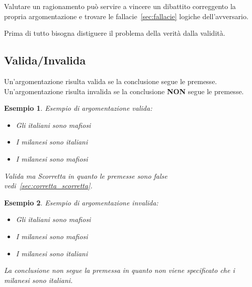 \documentclass[../main.tex, class=article, 12pt]{subfiles}
\newtheorem{exmp}{Esempio}[section]
\theoremstyle{definition}
\begin{document}
Valutare un ragionamento può servire a vincere un dibattito correggento la propria argomentazione e trovare le fallacie~\ref{sec:fallacie} logiche dell'avversario. \par

\begin{tcolorbox}
Prima di tutto bisogna distiguere il problema della verità dalla validità.
\end{tcolorbox}

\subsection{Valida/Invalida}\label{sec:valida_invalida}
Un'argomentazione risulta valida se la conclusione segue le premesse. \newline
Un'argomentazione risulta invalida se la conclusione \textbf{NON} segue le premesse. \newline
\begin{exmp}
        Esempio di argomentazione valida: \newline
        \begin{itemize}
                \item Gli italiani sono mafiosi
                \item I milanesi sono italiani
                \item I milanesi sono mafiosi
        \end{itemize}
        Valida ma Scorretta in quanto le premesse sono false vedi~\ref{sec:corretta_scorretta}.
\end{exmp}
\begin{exmp}
        Esempio di argomentazione invalida: \newline
        \begin{itemize}
                \item Gli italiani sono mafiosi
                \item I milanesi sono mafiosi 
                \item I milanesi sono italiani 
        \end{itemize}
        La conclusione non segue la premessa in quanto non viene specificato che i milanesi sono italiani.
\end{exmp}
\end{document}
